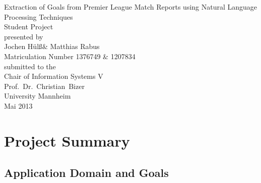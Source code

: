 \documentclass[11pt,titlepage,oneside,openany]{book}
\begin{document}
\lstset{language=HTML} 
\begin{titlepage}
	\vspace*{2cm}
  \begin{center}
   {\Large Extraction of Goals from Premier League Match Reports using Natural Language Processing Techniques\\}
   \vspace{2cm} 
   {Student  Project\\}
   \vspace{2cm}
   {presented by\\
    Jochen H\"{u}l\ss \xspace  \&  Matthias Rabus \\
    Matriculation Number 1376749 \& 1207834 \\
   }
   \vspace{1cm} 
   {submitted to the\\
    Chair of Information Systems V\\
    Prof.\ Dr.\ Christian\ Bizer\\
    University Mannheim\\} \vspace{2cm}
   {Mai 2013}
  \end{center}
\end{titlepage} 

\tableofcontents
\newpage


\listoffigures


\newpage



\chapter{Project Summary}
\section{Application Domain and Goals}
\label{sec:goals}
\end{document}
